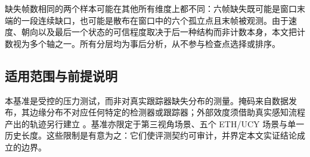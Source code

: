 缺失帧数相同的两个样本可能在其他所有维度上都不同：六帧缺失既可能是窗口末端的一段连续缺口，也可能是散布在窗口中的六个孤立点且末帧被观测。由于速度、朝向以及最后一个状态的可信程度取决于后一种结构而非计数本身，本文把计数视为多个轴之一。所有分层均为事后分析，从不参与检查点选择或排序。

\subsection{适用范围与前提说明}
本基准是受控的压力测试，而非对真实跟踪器缺失分布的测量。掩码来自数据发布，其边缘分布不对应任何特定的检测器或跟踪器；外部效度须借助真实感知流程产出的轨迹另行建立 \cite{fujii2024realtraj}。基准亦限定于第三视角场景、五个 ETH/UCY 场景与单一历史长度。这些限制是有意为之：它们使评测契约可审计，并界定本文实证结论成立的边界。
